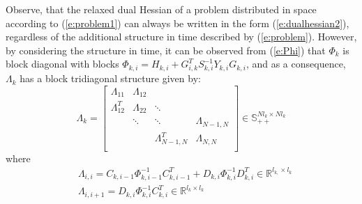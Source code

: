 \begin{remark}
Observe, that the relaxed dual Hessian of a problem distributed in space according to (\ref{e:problem1}) can always be written in the form (\ref{e:dualhessian2}), regardless of the additional structure in time described by (\ref{e:problem}). However, by considering the structure in time, it can be observed from (\ref{e:Phi}) that $\Phi_k$ is block diagonal with blocks $\Phi_{k,i} = H_{k,i} + G_{i,k}^T S_{k,i}^{-1} Y_{k,i} G_{k,i}$, and as a consequence, $\Lambda_k$ has a block tridiagonal structure given by:
\begin{equation}
\Lambda_k = \left[ \begin{array}{cccc} 
\Lambda_{11} &  \Lambda_{12} &   &  \\
\Lambda_{12}^T &  \Lambda_{22} & \ddots  &  \\
  &  \ddots & \ddots  & \Lambda_{N-1,N} \\
    &   & \Lambda_{N-1,N}^T  & \Lambda_{N,N} \\
\end{array} \right] \in \mathbb{S}_{++}^{N l_{k} \times N l_{k}}
\end{equation}
where
\begin{subequations}
\label{e:LambdaComponents}
\begin{align}
& \Lambda_{i,i} = C_{k,i-1}\Phi_{k,i-1}^{-1}C_{k,i-1}^T + D_{k,i}\Phi_{k,i}^{-1}D_{k,i}^T \in \mathbb{R}^{l_{k,} \times l_{k}} \\
& \Lambda_{i,i+1} = D_{k,i} \Phi_{k,i}^{-1}C_{k,i}^T \in \mathbb{R}^{l_{k} \times l_{k}}
\end{align}
\end{subequations}
\end{remark}

